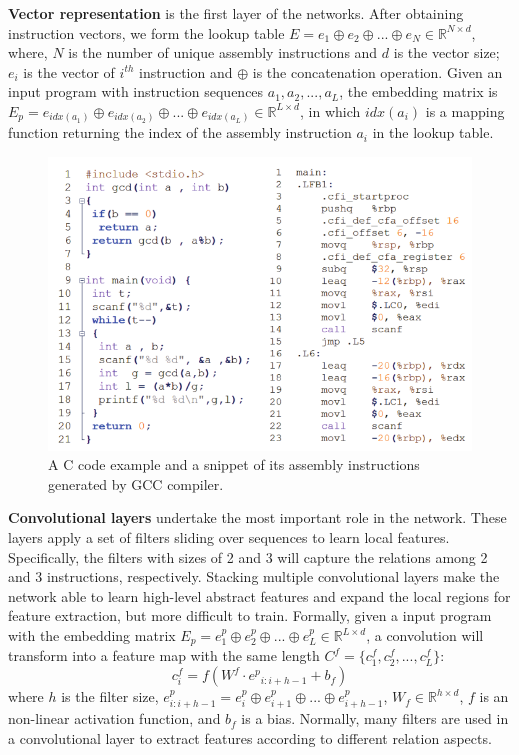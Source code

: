 \textbf{Vector representation} is the first layer of the networks. After obtaining instruction vectors, we form the lookup table $ E = e_1 \oplus e_2 \oplus ... \oplus e_N \in \mathbb{R}^{N \times d}$, where, $N$ is the number of unique assembly instructions and $d$ is the vector size; $e_i$ is the vector of $i^{th}$ instruction and $\oplus$ is the concatenation operation. Given an input program with instruction sequences $a_1, a_2, ..., a_L$, the embedding matrix is $E_p =  e_{idx(a_1)} \oplus e_{idx(a_2)} \oplus ... \oplus e_{idx(a_L)} \in \mathbb{R}^{L \times d} $,  in which $idx{(a_i)}$ is a mapping function returning the index of the assembly instruction $a_i$ in the lookup table.  
    \begin{center}
        \begin{figure}
        \includegraphics[width=\textwidth]{sections/figures/c2asm.png}
        \caption{A C code example and a snippet of its assembly instructions generated by GCC compiler.}
        \label{fig:c2asm}        
        \end{figure}
    \end{center}
\textbf{Convolutional layers} undertake the most important role in the network. These layers apply a set of filters sliding over sequences to learn local features. Specifically, the filters with sizes of 2 and 3 will capture the relations among 2 and 3 instructions, respectively. Stacking multiple convolutional layers make the network able to learn high-level abstract features and expand the local regions for feature extraction, but more difficult to train. Formally, given a input program with the embedding matrix $E_p =  e^p_1 \oplus e^p_2 \oplus ... \oplus e^p_L \in \mathbb{R}^{L \times d}$, a convolution will transform into a feature map with the same length $C^f =\{c^f_1, c^f_2, ..., c^f_L\}$:
    \begin{equation}
    c_i^f = f(W^f \cdot {e^p}_{i:i+h-1} + b_f)
    \end{equation}
    where $h$ is the filter size,
    $e^p_{i:i+h-1} = e^p_i \oplus e^p_{i+1} \oplus ... \oplus e^p_{i+h-1}$, $W_f \in \mathbb{R}^{h \times d}$, $f$ is an non-linear activation function, and $b_f$ is a bias.
Normally, many filters are used in a convolutional layer to extract features according to different relation aspects. 


